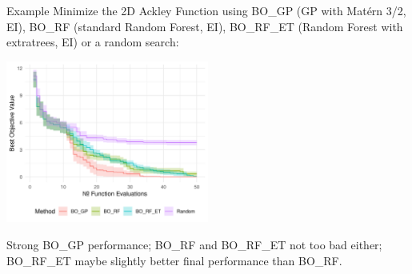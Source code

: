\documentclass[11pt,compress,t,notes=noshow, xcolor=table]{beamer}
\begin{document}
\begin{frame}{Example}
Minimize the 2D Ackley Function using BO\_GP (GP with Matérn 3/2, EI), BO\_RF (standard Random Forest, EI), BO\_RF\_ET (Random Forest with extratrees, EI) or a random search:
\begin{center}
  \includegraphics[width = 0.5\textwidth]{figure_man/surrogate_2.png}
\end{center}
Strong BO\_GP performance; BO\_RF and BO\_RF\_ET not too bad either; BO\_RF\_ET maybe slightly better final performance than BO\_RF.
\end{frame}

\endlecture
\end{document}
